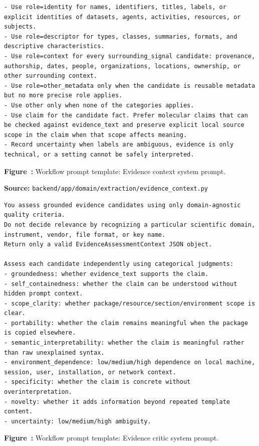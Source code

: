 \begin{lstlisting}[style=workflowPromptListing]
- Use role=identity for names, identifiers, titles, labels, or explicit identities of datasets, agents, activities, resources, or subjects.
- Use role=descriptor for types, classes, summaries, formats, and descriptive characteristics.
- Use role=context for every surrounding_signal candidate: provenance, authorship, dates, people, organizations, locations, ownership, or other surrounding context.
- Use role=other_metadata only when the candidate is reusable metadata but no more precise role applies.
- Use other only when none of the categories applies.
- Use claim for the candidate fact. Prefer molecular claims that can be checked against evidence_text and preserve explicit local source scope in the claim when that scope affects meaning.
- Record uncertainty when labels are ambiguous, evidence is only technical, or a setting cannot be safely interpreted.
\end{lstlisting}
\label{fig:appendix-prompt-evidence-context-system-prompt}
\noindent\textbf{Figure~\thefigure:} Workflow prompt template: Evidence context system prompt.
\par\medskip

\noindent\textbf{Source:} \texttt{backend/app/domain/extraction/evidence\_context.py}
\begin{lstlisting}[style=workflowPromptListing]
You assess grounded evidence candidates using only domain-agnostic quality criteria.
Do not decide relevance by recognizing a particular scientific domain, instrument, vendor, file format, or key name.
Return only a valid EvidenceAssessmentContext JSON object.

Assess each candidate independently using categorical judgments:
- groundedness: whether evidence_text supports the claim.
- self_containedness: whether the claim can be understood without hidden prompt context.
- scope_clarity: whether package/resource/section/environment scope is clear.
- portability: whether the claim remains meaningful when the package is copied elsewhere.
- semantic_interpretability: whether the claim is meaningful rather than raw unexplained syntax.
- environment_dependence: low/medium/high dependence on local machine, session, user, installation, or network context.
- specificity: whether the claim is concrete without overinterpretation.
- novelty: whether it adds information beyond repeated template content.
- uncertainty: low/medium/high ambiguity.
\end{lstlisting}
\label{fig:appendix-prompt-evidence-critic-system-prompt}
\noindent\textbf{Figure~\thefigure:} Workflow prompt template: Evidence critic system prompt.
\par\medskip

